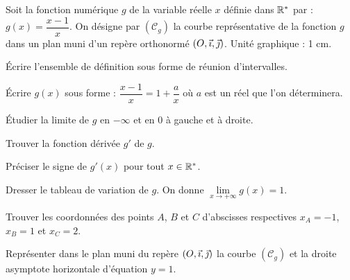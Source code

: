 \documentclass[11pt]{article}
\begin{document}
Soit la fonction numérique $g$ de la variable réelle $x$ définie dans $\mathbb{R}^*$ par : $g(x) = \dfrac{x - 1}{x}$. On désigne par $(\mathcal{C}_g)$ la courbe représentative de la fonction $g$ dans un plan muni d'un repère orthonormé $(O,\vec{\imath},\vec{\jmath})$. Unité graphique : 1 cm.
\begin{questions}
  \item \begin{sousq}
    \item Écrire l'ensemble de définition sous forme de réunion d'intervalles.
    \item Écrire $g(x)$ sous forme : $\dfrac{x - 1}{x} = 1 + \dfrac{a}{x}$ où $a$ est un réel que l'on déterminera.
    \item Étudier la limite de $g$ en $-\infty$ et en $0$ à gauche et à droite.
  \end{sousq}
  \item \begin{sousq}
    \item Trouver la fonction dérivée $g'$ de $g$.
    \item Préciser le signe de $g'(x)$ pour tout $x \in \mathbb{R}^*$.
    \item Dresser le tableau de variation de $g$. On donne $\lim\limits_{x\to+\infty} g(x) = 1$.
  \end{sousq}
  \item \begin{sousq}
    \item Trouver les coordonnées des points $A$, $B$ et $C$ d'abscisses respectives $x_A = -1$, $x_B = 1$ et $x_C = 2$.
    \item Représenter dans le plan muni du repère $(O,\vec{\imath},\vec{\jmath})$ la courbe $(\mathcal{C}_g)$ et la droite asymptote horizontale d'équation $y = 1$.
  \end{sousq}
\end{questions}
\end{document}
